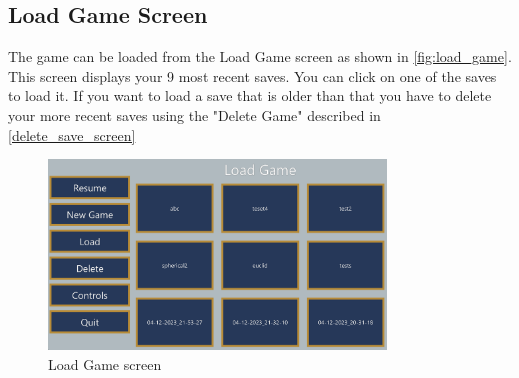 \subsection{Load Game Screen}
The game can be loaded from the Load Game screen as shown in \autoref{fig:load_game}.
This screen displays your 9 most recent saves.
You can click on one of the saves to load it.
If you want to load a save that is older than that you have to delete your more recent saves using the "Delete Game" described in \autoref{delete_save_screen}

\begin{figure}[H]
    \centering
    \includegraphics[width=0.8\textwidth]{sections/user_manual/resources/load-game.png}
    \caption{Load Game screen}
    \label{fig:load_game}
\end{figure}